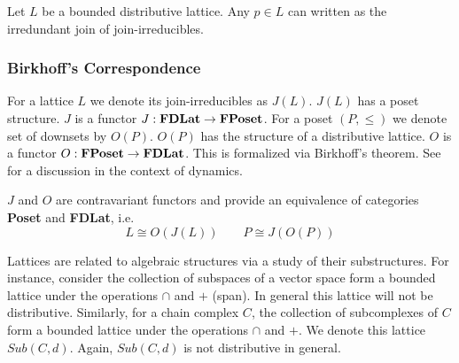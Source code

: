\begin{lem}\label{lem:join}
Let $L$ be a bounded distributive lattice.  Any $p\in L$ can written as the irredundant join of join-irreducibles.
\end{lem}


\subsubsection{Birkhoff's Correspondence}

For a lattice $L$ we denote its join-irreducibles as $J(L)$.  $J(L)$ has a poset structure.  $J$ is a functor $J:{\bf FDLat}\to {\bf FPoset}$.  For a poset $(P,\leq)$ we denote set of downsets by $O(P)$. $O(P)$ has the structure of a distributive lattice.  $O$ is a functor $O:{\bf FPoset}\to {\bf FDLat}$.  This is formalized via Birkhoff's theorem.  See~\cite{lsa,lsa2,salamon} for a discussion in the context of dynamics.

\begin{thm}\label{thm:birkhoff}
$J$ and $O$ are contravariant functors and provide an equivalence of categories {\bf Poset} and {\bf FDLat}, i.e. $$L\cong O(J(L))\quad\quad P\cong J(O(P))$$

\end{thm}

Lattices are related to algebraic structures via a study of their substructures.  For instance, consider the collection of subspaces of a vector space form a bounded lattice under the operations $\cap$ and $+$ (span). In general this lattice will not be distributive. Similarly, for a chain complex $C$, the collection of subcomplexes of $C$ form a bounded lattice under the operations $\cap$ and $+$.  We denote this lattice $Sub(C,d)$.  Again, $Sub(C,d)$ is not distributive in general.









